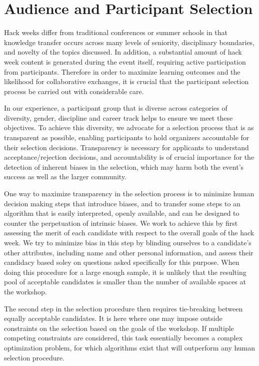 \section*{Audience and Participant Selection}

Hack weeks differ from traditional conferences or summer schools in that knowledge transfer occurs across many levels of seniority, disciplinary boundaries, and novelty of the topics discussed.
In addition, a substantial amount of hack week content is generated during the event itself, requiring active participation from participants.
Therefore in order to maximize learning outcomes and the likelihood for collaborative exchanges, it is crucial that the participant selection process be carried out with considerable care.

In our experience, a participant group that is diverse across categories of diversity, gender, discipline and career track helps to ensure we meet these objectives.
To achieve this diversity, we advocate for a selection process that is as transparent as possible, enabling participants to hold organizers accountable for their selection decisions.
Transparency is necessary for applicants to understand acceptance/rejection decisions, and accountability is of crucial importance for the detection of inherent biases in the selection, which may harm both the event's success as well as the larger community.

One way to maximize transparency in the selection process is to minimize human decision making steps that introduce biases, and to transfer some steps to an algorithm that is easily interpreted, openly available, and can be designed to counter the perpetuation of intrinsic biases. 
We work to achieve this by first assessing the merit of each candidate with respect to the overall goals of the hack week.
We try to minimize bias in this step by blinding ourselves to a candidate's other attributes, including name and other personal information, and assess their candidacy based soley on questions asked specifically for this purpose.
When doing this procedure for a large enough sample, it is unlikely that the resulting pool of acceptable candidates is smaller than the number of available spaces at the workshop.

The second step in the selection procedure then requires tie-breaking between equally acceptable candidates.
It is here where one may impose outside constraints on the selection based on the goals of the workshop.
If multiple competing constraints are considered, this task essentially becomes a complex optimization problem, for which algorithms exist that will outperform any human selection procedure.

